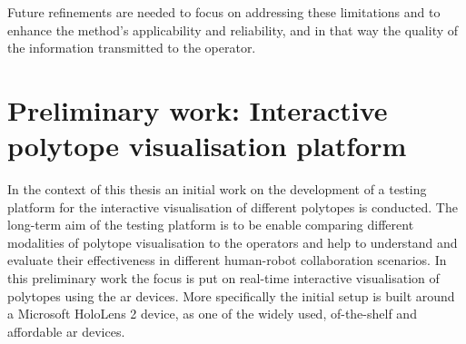 Future refinements are needed to focus on addressing these limitations and to enhance the method's applicability and reliability, and in that way the quality of the information transmitted to the operator.




\section{Preliminary work: Interactive polytope visualisation platform}
\label{ch:claire}


In the context of this thesis an initial work on the development of a testing platform for the interactive visualisation of different polytopes is conducted.
The long-term aim of the testing platform is to be enable comparing different modalities of polytope visualisation to the operators and help to understand and evaluate their effectiveness in different human-robot collaboration scenarios. In this preliminary work the focus is put on real-time interactive visualisation of polytopes using the \gls{ar} devices. More specifically the initial setup is built around a Microsoft HoloLens 2 device, as one of the widely used, of-the-shelf and affordable \gls{ar} devices.



